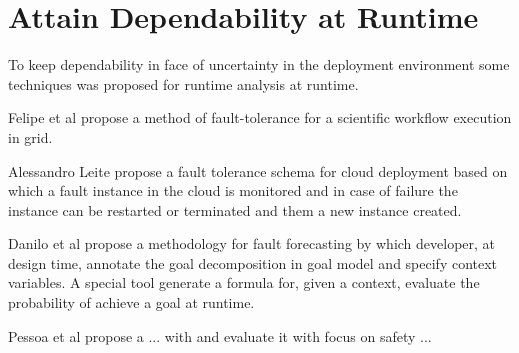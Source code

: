 
\section{Attain Dependability at Runtime }
To keep dependability in face of uncertainty in the deployment environment some techniques was proposed for runtime analysis at runtime.

Felipe et al\cite{guimaraes_framework_2013} propose a method of fault-tolerance for a scientific workflow execution in grid.

Alessandro Leite \cite{ferreira_leite_user-centered_2014} propose a fault tolerance schema for cloud deployment based on which a fault instance in the cloud is monitored and in case of failure the instance can be restarted or terminated and them a new instance created.

Danilo et al\cite{mendonca_dependability_2015} propose a methodology for fault forecasting by which developer, at design time, annotate the goal decomposition in goal model and specify context variables. A special tool generate a formula for, given a context, evaluate the probability of achieve a goal at runtime.

Pessoa et al \cite{pessoa_dependable_2015} propose a ... with and evaluate it with focus on safety ...


